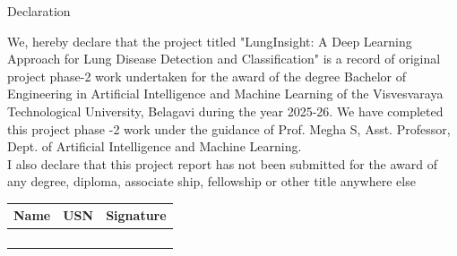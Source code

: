 \begin{center}
	{\LARGE Declaration}
\end{center}
\vspace{0.2in}

We, hereby declare that the project titled "LungInsight: A Deep Learning Approach for Lung Disease Detection and Classification" 
is a record of original project phase-2 work undertaken for the award of the degree Bachelor
of Engineering in Artificial Intelligence and Machine Learning of the Visvesvaraya Technological
University, Belagavi during the year 2025-26. We have completed this project phase -2
work under the guidance of Prof. Megha S, Asst. Professor, Dept. of Artificial Intelligence and Machine Learning.\\

I also declare that this project report has not been submitted for the award of any degree,
diploma, associate ship, fellowship or other title anywhere else

\vskip 2cm
\begin{center}
	
\begin{tabular}{|p{3cm}|p{3cm}|p{3cm}|} 	\hline
Name	&  USN &  Signature    \\ 	\hline
	&  &    \\ 	\hline
	&  &    \\ 	\hline
	&  &    \\ 	\hline
	&  &    \\ 	\hline
\end{tabular}
\end{center}